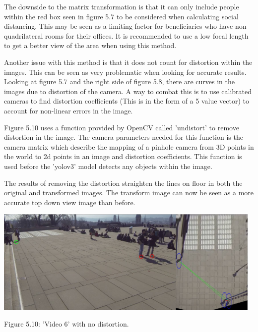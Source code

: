 \documentclass[12pt]{report}
\begin{document}
\vspace{2mm}

The downside to the matrix transformation is that it can only include people within the red box seen in figure 5.7 to be considered when calculating social distancing. This may be seen as a limiting factor for beneficiaries who have non-quadrilateral rooms for their offices. It is recommended to use a low focal length to get a better view of the area when using this method.

\vspace{2mm}

Another issue with this method is that it does not count for distortion within the images. This can be seen as very problematic when looking for accurate results. Looking at figure 5.7 and the right side of figure 5.8, there are curves in the images due to distortion of the camera. A way to combat this is to use calibrated cameras to find distortion coefficients (This is in the form of a 5 value vector) to account for non-linear errors in the image.

\vspace{2mm}

Figure 5.10 uses a function provided by OpenCV called 'undistort' to remove distortion in the image. The camera parameters needed for this function is the camera matrix which describe the mapping of a pinhole camera from 3D points in the world to 2d points in an image and distortion coefficients. This function is used before the 'yolov3' model detects any objects within the image.

\vspace{2mm}

The results of removing the distortion straighten the lines on floor in both the original and transformed images. The transform image can now be seen as a more accurate top down view image than before.

\begin{center}
	\includegraphics[width=130mm]{./images/appendix/UndistortedImageWithMatrixTransformation.JPG}
	
	{\footnotesize Figure 5.10: 'Video 6' with no distortion.}
\end{center}
\end{document}
